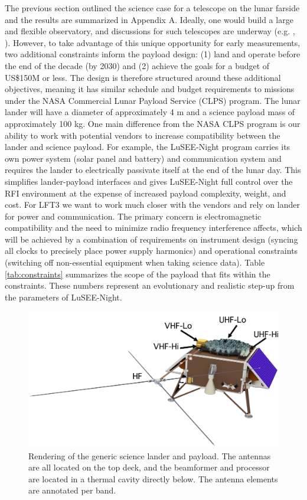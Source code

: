 The previous section outlined the science case for a telescope on the lunar farside and the results are summarized in Appendix A.  Ideally, one would build a large and flexible observatory, and discussions for such telescopes are underway (e.g. \citealt{burns2021lunarfarsidelowradio}, \citealt{9438165}).  However, to take advantage of this unique opportunity for early measurements, two additional constraints inform the payload design: (1) land and operate before the end of the decade (by 2030) and (2) achieve the goals for a budget of US\$150M or less.  The design is therefore structured around these additional objectives, meaning it has similar schedule and budget requirements to missions under the NASA Commercial Lunar Payload Service (CLPS) program.  The lunar lander will have a diameter of approximately 4 m and a science payload mass of approximately 100 kg.  One main difference from the NASA CLPS program is our ability to work with potential vendors to increase compatibility between the lander and science payload. For example, the LuSEE-Night program carries its own power system (solar panel and battery) and communication system and requires the lander to electrically passivate itself at the end of the lunar day. This simplifies lander-payload interfaces and gives LuSEE-Night full control over the RFI environment at the expense of increased payload complexity, weight, and cost. For LFT3 we want to work much closer with the vendors and rely on lander for power and communication.   The primary concern is electromagnetic compatibility and the need to minimize radio frequency interference affects, which will be achieved by a combination of requirements on instrument design (syncing all clocks to precisely place power supply harmonics) and operational constraints (switching off non-essential equipment when taking science data). Table \ref{tab:constraints} summarizes the scope of the payload that fits within the constraints. These numbers represent an evolutionary and realistic step-up from the parameters of LuSEE-Night.

\begin{figure}
	\centering
	\includegraphics[width=\linewidth]{figures/LFT Deployed 02.png}
	\caption{Rendering of the generic science lander and payload.  The antennas are all located on the top deck, and the beamformer and processor are located in a thermal cavity directly below.  The antenna elements are annotated per band. \label{fig:render}}
\end{figure}

